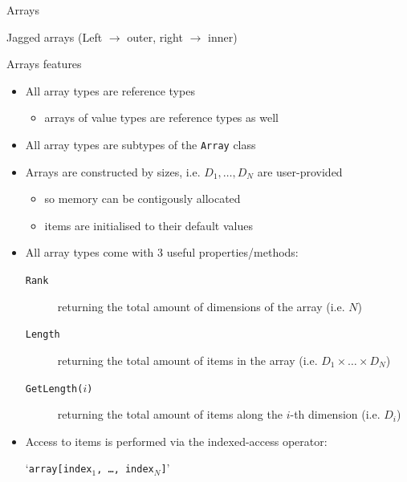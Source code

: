 \documentclass[presentation]{beamer}
\newcommand{\op}[1]{\alert{`\texttt{#1}'}}
\newcommand{\operand}[1][\ldots]{{\normalcolor#1}}
\begin{document}
\begin{frame}[allowframebreaks]{\dotnet Arrays}
\begin{alertblock}{Jagged arrays}
        (Left $\rightarrow$ outer, right $\rightarrow$ inner)
    \end{alertblock}

    \begin{exampleblock}{Arrays features}
        \begin{itemize}
            \item All array types are \alert{reference} types
            \begin{itemize}
                \item arrays of value types are reference types as well
            \end{itemize}

            \item All array types are subtypes of the \texttt{Array} class

            \item Arrays are constructed by sizes, i.e. $D_1, \ldots, D_N$ are user-provided
            \begin{itemize}
                \item so memory can be contigously allocated
                \item items are initialised to their default values
            \end{itemize}

            \item All array types come with 3 useful properties/methods:
            \begin{description}
                \item[\texttt{Rank}] returning the total amount of dimensions of the array (i.e. $N$)
                \item[\texttt{Length}] returning the total amount of items in the array (i.e. $D_1 \times \ldots \times D_N$)
                \item[\texttt{GetLength($i$)}] returning the total amount of items along the $i$-th dimension (i.e. $D_i$)
            \end{description}

            \item Access to items is performed via the indexed-access operator:
            \begin{center}
                \op{\operand[array][\operand[index$_1$, \ldots, index$_N$]]}  
            \end{center}
        \end{itemize}
    \end{exampleblock}
\end{frame} 
\end{document}

